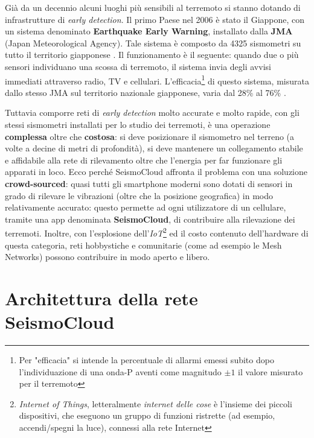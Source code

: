 \documentclass[a4paper,10pt]{memoir}
\begin{document}
Già da un decennio alcuni luoghi più sensibili al terremoto si stanno dotando di infrastrutture di \textit{early detection}. Il primo Paese nel 2006 è stato il Giappone, con un sistema denominato \textbf{Earthquake Early Warning}, installato dalla \textbf{JMA} (Japan Meteorological Agency). Tale sistema è composto da 4325 sismometri su tutto il territorio giapponese \cite{jma}. Il funzionamento è il seguente: quando due o più sensori individuano una scossa di terremoto, il sistema invia degli avvisi immediati attraverso radio, TV e cellulari. L'efficacia\footnote{Per "efficacia" si intende la percentuale di allarmi emessi subito dopo l'individuazione di una onda-P aventi come magnitudo $\pm1$ il valore misurato per il terremoto} di questo sistema, misurata dallo stesso JMA sul territorio nazionale giapponese, varia dal 28\% al 76\% \cite{jma}.

Tuttavia comporre reti di \textit{early detection} molto accurate e molto rapide, con gli stessi sismometri installati per lo studio dei terremoti, è una operazione \textbf{complessa} oltre che \textbf{costosa}: si deve posizionare il sismometro nel terreno (a volte a decine di metri di profondità), si deve mantenere un collegamento stabile e affidabile alla rete di rilevamento oltre che l'energia per far funzionare gli apparati in loco. Ecco perché SeismoCloud affronta il problema con una soluzione \textbf{crowd-sourced}: quasi tutti gli smartphone moderni sono dotati di sensori in grado di rilevare le vibrazioni (oltre che la posizione geografica) in modo relativamente accurato\cite{eewapp}: questo permette ad ogni utilizzatore di un cellulare, tramite una app denominata \textbf{SeismoCloud}, di contribuire alla rilevazione dei terremoti. Inoltre, con l'esplosione dell'\textit{IoT}\footnote{\textit{Internet of Things}, letteralmente \textit{internet delle cose} è l'insieme dei piccoli dispositivi, che eseguono un gruppo di funzioni ristrette (ad esempio, accendi/spegni la luce), connessi alla rete Internet} ed il costo contenuto dell'hardware di questa categoria, reti hobbystiche e comunitarie (come ad esempio le Mesh Networks) possono contribuire in modo aperto e libero.

\pagebreak
%
%

\section{Architettura della rete SeismoCloud}
\end{document}

